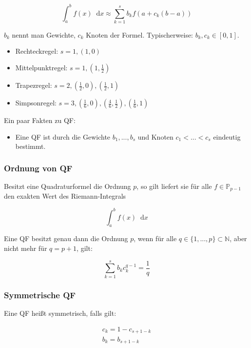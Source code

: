 \documentclass[a4paper, 14pt]{article}
\newcommand*\diff{\mathop{}\!\mathrm{d}}
\begin{document}
	\begin{equation}
		\int_a^b{f(x) \diff x} \approx \sum_{k = 1}^{s}{b_k f(a + c_k (b - a))}
	\end{equation}

	$b_k$ nennt man Gewichte, $c_k$ Knoten der Formel.
	Typischerweise: $b_k, c_k \in [0, 1]$.

	\begin{itemize}
		\item Rechteckregel: $s = 1, (1, 0)$
		\item Mittelpunktregel: $s = 1, (1, \frac{1}{2})$
		\item Trapezregel: $s = 2, (\frac{1}{2}, 0), (\frac{1}{2}, 1)$
		\item Simpsonregel: $s = 3, (\frac{1}{6}, 0), (\frac{4}{6}, \frac{1}{2}), (\frac{1}{6}, 1)$
	\end{itemize}

	Ein paar Fakten zu QF:

	\begin{itemize}
		\item Eine QF ist durch die Gewichte $b_1, ..., b_s$ und Knoten $c_1 < ...  < c_s$ eindeutig bestimmt.
	\end{itemize}

	\subsubsection{Ordnung von QF}

	Besitzt eine Quadraturformel die Ordnung $p$, so gilt liefert sie für alle $f \in \mathbb{P}_{p-1}$ den exakten Wert des Riemann-Integrals

	\begin{equation}
		\int_a^b{f(x) \diff x}
	\end{equation}

	Eine QF besitzt genau dann die Ordnung $p$, wenn für alle $q \in \{1, ..., p\} \subset \mathbb{N}$, aber nicht mehr für $q = p + 1$, gilt:

	\begin{equation}
		\sum_{k = 1}^{s}{b_k c_k^{q - 1}} = \frac{1}{q}
	\end{equation}

	\subsubsection{Symmetrische QF}

	Eine QF heißt symmetrisch, falls gilt:

	\begin{eqnarray}
		c_k = 1 - c_{s + 1 - k} \\
		b_k = b_{s + 1 - k}
	\end{eqnarray}
\end{document}
